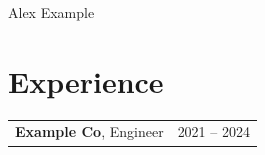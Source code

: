 \documentclass[10pt, letterpaper]{article}
\begin{document}
\begin{center}{\fontsize{25pt}{25pt}\selectfont Alex Example}\end{center}
\section{Experience}
\begin{tabularx}{\linewidth}{X r}
\textbf{Example Co}, Engineer & 2021 -- 2024 \\
\end{tabularx}
\end{document}
